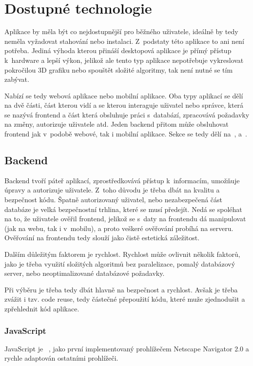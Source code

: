 \section{Dostupné technologie}
\label{sc:available_technologies}
Aplikace by měla být co nejdostupnější pro běžného uživatele, ideálně by tedy neměla vyžadovat stahování nebo instalaci. Z~podstaty této aplikace to ani není potřeba. Jediná výhoda kterou přináší desktopová aplikace je přímý přístup k~hardware a lepší výkon, jelikož ale tento typ aplikace nepotřebuje vykreslovat pokročilou 3D grafiku nebo spouštět složité algoritmy, tak není nutné se tím zabývat.

Nabízí se tedy webová aplikace nebo mobilní aplikace. Oba typy aplikací se dělí na dvě části, část kterou vidí a se kterou interaguje uživatel nebo správce, která se nazývá frontend a část která obsluhuje práci s~databází, zpracovává požadavky na změny, autorizuje uživatele atd. Jeden backend přitom může obsluhovat frontend jak v~podobě webové, tak i mobilní aplikace. Sekce se tedy dělí na~,  a~.

\subsection{Backend}
\label{ss:backend}
Backend tvoří páteř aplikací, zprostředkovává přístup k~informacím, umožňuje úpravy a autorizuje uživatele. Z~toho důvodu je třeba dbát na kvalitu a bezpečnost kódu. Špatně autorizovaný uživatel, nebo nezabezpečená část databáze je velká bezpečnostní trhlina, které se musí předejít. Nedá se spoléhat na to, že uživatele ověřil frontend, jelikož se s~daty na frontendu dá manipulovat (jak na webu, tak i v~mobilu), a proto veškeré ověřování probíhá na serveru. Ověřování na frontendu tedy slouží jako čistě estetická záležitost.

Dalším důležitým faktorem je rychlost. Rychlost může ovlivnit několik faktorů, jako je třeba využití složitých algoritmů bez paralelizace, pomalý databázový server, nebo neoptimalizované databázové požadavky.

Při výběru je třeba tedy dbát hlavně na bezpečnost a rychlost. Avšak je třeba zvážit i tzv. code reuse, tedy částečné přepoužití kódu, které muže zjednodušit a zpřehlednit kód aplikace.

\subsubsection*{JavaScript}
JavaScript je \emph{}~\cite{netscapecommunicationscorporation_1995_press}, jako první implementovaný prohlížečem Netscape Navigator 2.0 a rychle adaptován ostatními prohlížeči.

